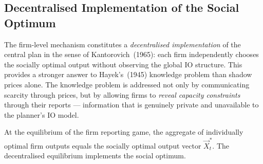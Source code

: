 \subsection{Decentralised Implementation of the Social Optimum}\label{sec:decentralised}

The firm-level mechanism constitutes a \textit{decentralised implementation} of the
central plan in the sense of Kantorovich~(1965): each firm independently chooses the
socially optimal output without observing the global IO structure. This provides a
stronger answer to Hayek's~(1945) knowledge problem than shadow prices alone. The
knowledge problem is addressed not only by communicating scarcity through prices, but
by allowing firms to \textit{reveal capacity constraints} through their reports ---
information that is genuinely private and unavailable to the planner's IO model.

\begin{corollary}\label{cor:lange}
At the equilibrium of the firm reporting game, the aggregate of individually optimal
firm outputs equals the socially optimal output vector $\vec{X}_t^*$. The
decentralised equilibrium implements the social optimum.
\end{corollary}

